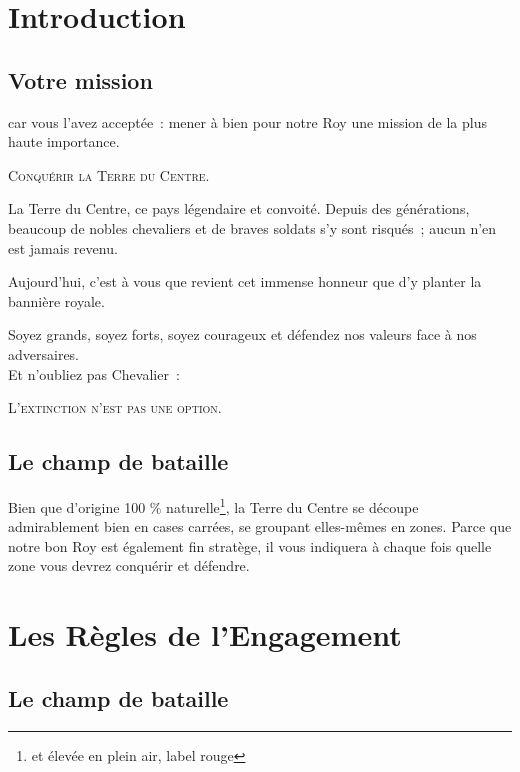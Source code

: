 \section{Introduction}



\newpage

\subsection{Votre mission}

car vous l'avez acceptée~: mener à bien
pour notre Roy une mission de la plus haute importance.

\begin{center}
  {\large\textsc{Conquérir la Terre du Centre.}}
\end{center}

La Terre du Centre, ce pays légendaire et convoité. Depuis des
générations, beaucoup de nobles chevaliers et de braves soldats s'y sont
risqués~; aucun n'en est jamais revenu.

Aujourd'hui, c'est à vous que revient cet immense honneur que d'y
planter la bannière royale.

Soyez grands, soyez forts, soyez courageux et défendez nos valeurs
face à nos adversaires.\\

Et n'oubliez pas Chevalier~:

\begin{center}
  \textsc{L'extinction n'est pas une option.}
\end{center}

\subsection{Le champ de bataille}

Bien que d'origine 100 \%{} naturelle\footnote{et élevée en plein air,
  label rouge}, la Terre du Centre se découpe admirablement bien en
cases carrées, se groupant elles-mêmes en zones. Parce que notre bon
Roy est également fin stratège, il vous indiquera à chaque fois quelle
zone vous devrez conquérir et défendre.
\newpage

\section{Les Règles de l'Engagement}

\subsection{Le champ de bataille}

